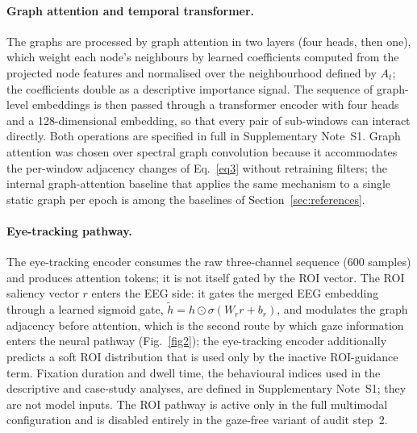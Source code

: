 \paragraph{Graph attention and temporal transformer.} The graphs are processed by graph attention \cite{ref43} in two layers (four heads, then one), which weight each node's neighbours by learned coefficients computed from the projected node features and normalised over the neighbourhood defined by $A_t$; the coefficients double as a descriptive importance signal. The sequence of graph-level embeddings is then passed through a transformer encoder \cite{ref44} with four heads and a 128-dimensional embedding, so that every pair of sub-windows can interact directly. Both operations are specified in full in Supplementary Note~S1. Graph attention was chosen over spectral graph convolution because it accommodates the per-window adjacency changes of Eq.~\eqref{eq3} without retraining filters; the internal graph-attention baseline that applies the same mechanism to a single static graph per epoch is among the baselines of Section~\ref{sec:references}.

\paragraph{Eye-tracking pathway.} The eye-tracking encoder consumes the raw three-channel sequence (600 samples) and produces attention tokens; it is not itself gated by the ROI vector. The ROI saliency vector $r$ enters the EEG side: it gates the merged EEG embedding through a learned sigmoid gate, $\tilde h = h \odot \sigma(W_r r + b_r)$, and modulates the graph adjacency before attention, which is the second route by which gaze information enters the neural pathway (Fig.~\ref{fig2}); the eye-tracking encoder additionally predicts a soft ROI distribution that is used only by the inactive ROI-guidance term. Fixation duration and dwell time, the behavioural indices used in the descriptive and case-study analyses, are defined in Supplementary Note~S1; they are not model inputs. The ROI pathway is active only in the full multimodal configuration and is disabled entirely in the gaze-free variant of audit step~2.

